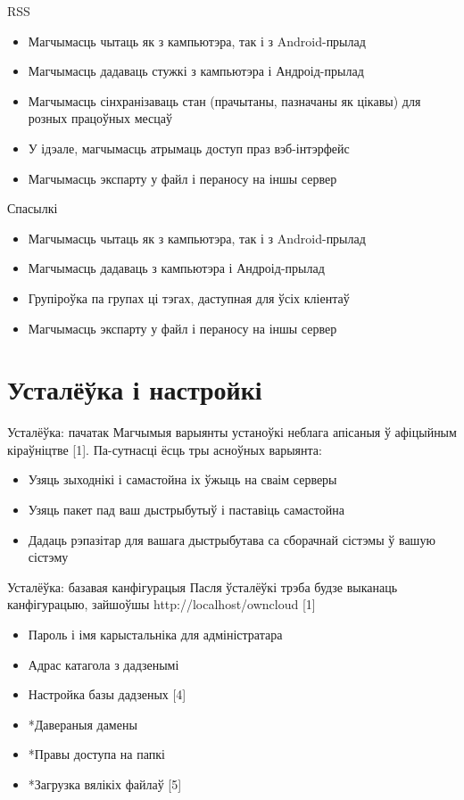 \documentclass[ignorenonframetext,hyperref={pdftex,unicode}]{beamer}
\begin{document}
\begin{frame}{RSS}
	\begin{itemize}
		\item Магчымасць чытаць як з кампьютэра, так і з Android-прылад
		\item Магчымасць дадаваць стужкі з кампьютэра і Андроід-прылад
		\item Магчымасць сінхранізаваць стан (прачытаны, пазначаны як цікавы) для розных працоўных месцаў
		\item У ідэале, магчымасць атрымаць доступ праз вэб-інтэрфейс
		\item Магчымасць экспарту у файл і пераносу на іншы сервер
	\end{itemize}
\end{frame}

\begin{frame}{Спасылкі}
	\begin{itemize}
		\item Магчымасць чытаць як з кампьютэра, так і з Android-прылад
		\item Магчымасць дадаваць з кампьютэра і Андроід-прылад
		\item Групіроўка па групах ці тэгах, даступная для ўсіх кліентаў
		\item Магчымасць экспарту у файл і пераносу на іншы сервер
	\end{itemize}
\end{frame}

\section{Усталёўка і настройкі}
\begin{frame}{Усталёўка: пачатак}
	Магчымыя варыянты устаноўкі неблага апісаныя ў афіцыйным кіраўніцтве [1]. Па-сутнасці ёсць тры асноўных варыянта:
	\begin{itemize}
		\item Узяць зыходнікі і самастойна іх ўжыць на сваім серверы
		\item Узяць пакет пад ваш дыстрыбутыў і паставіць самастойна
		\item Дадаць рэпазітар для вашага дыстрыбутава са сборачнай сістэмы ў вашую сістэму
	\end{itemize}
\end{frame}

\begin{frame}{Усталёўка: базавая канфігурацыя}
	Пасля ўсталёўкі трэба будзе выканаць канфігурацыю, зайшоўшы http://localhost/owncloud [1]
	\begin{itemize}
		\item Пароль і імя карыстальніка для адміністратара
		\item Адрас катагола з дадзенымі
		\item Настройка базы дадзеных [4]
		\item *Давераныя дамены
		\item *Правы доступа на папкі
		\item *Загрузка вялікіх файлаў [5]
	\end{itemize}
\end{frame}
\end{document}
